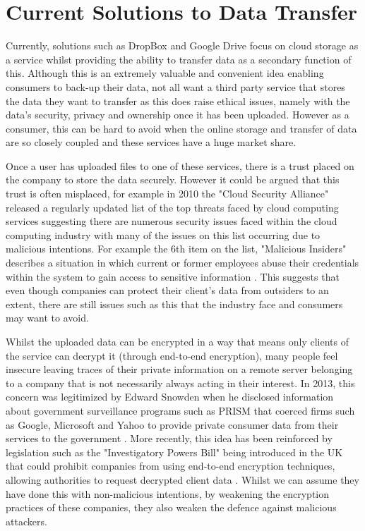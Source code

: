 \documentclass[]{report}
\begin{document}
	\section{Current Solutions to Data Transfer}
	Currently, solutions such as DropBox and Google Drive focus on cloud storage as a service whilst providing the ability to transfer data as a secondary function of this. Although this is an extremely valuable and convenient idea enabling consumers to back-up their data, not all want a third party service that stores the data they want to transfer as this does raise ethical issues, namely with the data's security, privacy and ownership once it has been uploaded. However as a consumer, this can be hard to avoid when the online storage and transfer of data are so closely coupled and these services have a huge market share.
	
	Once a user has uploaded files to one of these services, there is a trust placed on the company to store the data securely. However it could be argued that this trust is often misplaced, for example in 2010 the "Cloud Security Alliance" released a regularly updated list of the top threats faced by cloud computing services suggesting there are numerous security issues faced within the cloud computing industry with many of the issues on this list occurring due to malicious intentions. For example the 6th item on the list, "Malicious Insiders" describes a situation in which current or former employees abuse their credentials within the system to gain access to sensitive information \cite{CSA Top Threats}. This suggests that even though companies can protect their client's data from outsiders to an extent, there are still issues such as this that the industry face and consumers may want to avoid.
	
	Whilst the uploaded data can be encrypted in a way that means only clients of the service can decrypt it (through end-to-end encryption), many people feel insecure leaving traces of their private information on a remote server belonging to a company that is not necessarily always acting in their interest. In 2013, this concern was legitimized by Edward Snowden when he disclosed information about government surveillance programs such as PRISM that coerced firms such as Google, Microsoft and Yahoo to provide private consumer data from their services to the government \cite{PRISM}. More recently, this idea has been reinforced by legislation such as the "Investigatory Powers Bill" being introduced in the UK that could prohibit companies from using end-to-end encryption techniques, allowing authorities to request decrypted client data \cite{IPB Encryption}. Whilst we can assume they have done this with non-malicious intentions, by weakening the encryption practices of these companies, they also weaken the defence against malicious attackers.
	
\end{document}
